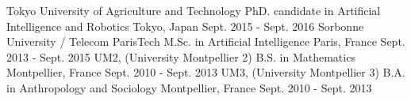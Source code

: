 \begin{cventries}
    \cventryEducation
    {Tokyo University of Agriculture and Technology}
    {PhD. candidate in Artificial Intelligence and Robotics}
    {Tokyo, Japan}
    {Sept. 2015 - Sept. 2016}
    {}
    \cventryEducation
    {Sorbonne University / Telecom ParisTech}
    {M.Sc. in Artificial Intelligence}
    {Paris, France}
    {Sept. 2013 - Sept. 2015}
    {}
    \cventryEducation
    {UM2, (University Montpellier 2)}
    {B.S. in Mathematics }
    {Montpellier, France}
    {Sept. 2010 - Sept. 2013}
    {}
    \cventryEducation
    {UM3, (University Montpellier 3)}
    {B.A. in Anthropology and Sociology}
    {Montpellier, France}
    {Sept. 2010 - Sept. 2013}
    {}
\end{cventries}
